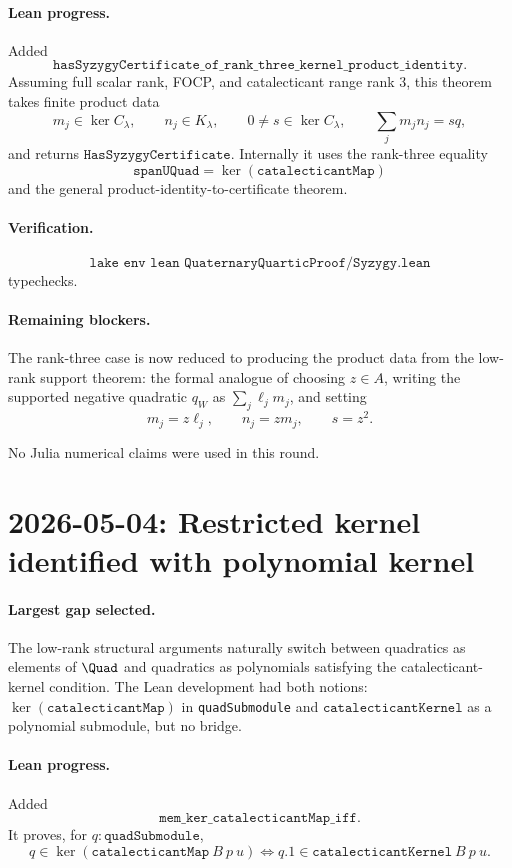 \documentclass[11pt]{article}
\begin{document}
\paragraph{Lean progress.}
Added
\[
\texttt{hasSyzygyCertificate\_of\_rank\_three\_kernel\_product\_identity}.
\]
Assuming full scalar rank, FOCP, and catalecticant range rank \(3\), this
theorem takes finite product data
\[
m_j\in\ker C_\lambda,\qquad n_j\in K_\lambda,\qquad
0\ne s\in\ker C_\lambda,\qquad \sum_j m_jn_j=sq,
\]
and returns \(\texttt{HasSyzygyCertificate}\).  Internally it uses the
rank-three equality
\[
\texttt{spanUQuad}=\ker(\texttt{catalecticantMap})
\]
and the general product-identity-to-certificate theorem.

\paragraph{Verification.}
\[
\texttt{lake env lean QuaternaryQuarticProof/Syzygy.lean}
\]
typechecks.

\paragraph{Remaining blockers.}
The rank-three case is now reduced to producing the product data from the
low-rank support theorem: the formal analogue of choosing \(z\in A\), writing
the supported negative quadratic \(q_W\) as \(\sum_j \ell_jm_j\), and setting
\[
m_j=z\ell_j,\qquad n_j=zm_j,\qquad s=z^2.
\]

No Julia numerical claims were used in this round.

\section*{2026-05-04: Restricted kernel identified with polynomial kernel}

\paragraph{Largest gap selected.}
The low-rank structural arguments naturally switch between quadratics as
elements of \(\Quad\) and quadratics as polynomials satisfying the
catalecticant-kernel condition.  The Lean development had both notions:
\(\ker(\texttt{catalecticantMap})\) in \texttt{quadSubmodule} and
\(\texttt{catalecticantKernel}\) as a polynomial submodule, but no bridge.

\paragraph{Lean progress.}
Added
\[
\texttt{mem\_ker\_catalecticantMap\_iff}.
\]
It proves, for \(q:\texttt{quadSubmodule}\),
\[
q\in\ker(\texttt{catalecticantMap}\ B\ p\ u)
\iff
q.1\in\texttt{catalecticantKernel}\ B\ p\ u.
\]
\end{document}

